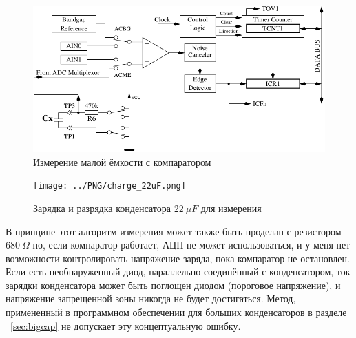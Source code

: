 \begin{figure}[H]
\centering
\includegraphics[width=.8\textwidth]{../FIG/Comparat.pdf}
\caption{Измерение малой ёмкости с компаратором}
\label{fig:comparat}
\end{figure}

\begin{figure}[H]
  \centering
    \texttt{[image: ../PNG/charge\_22uF.png]}
  \caption{Зарядка и разрядка конденсатора \(22~\mu F\) для измерения}
  \label{pic:c22uF}
\end{figure}


В принципе этот алгоритм измерения может также быть проделан с резистором \(680~\Omega\) но, если компаратор работает, 
АЦП не может использоваться, и у меня нет возможности контролировать напряжение заряда, пока компаратор не остановлен. 
Если есть необнаруженный диод, параллельно соединённый с конденсатором, ток зарядки конденсатора может быть поглощен 
диодом (пороговое напряжение), и напряжение запрещенной зоны никогда не будет достигаться. Метод, примененный в 
программном обеспечении для больших конденсаторов в разделе ~\ref{sec:bigcap} не допускает эту концептуальную ошибку.

